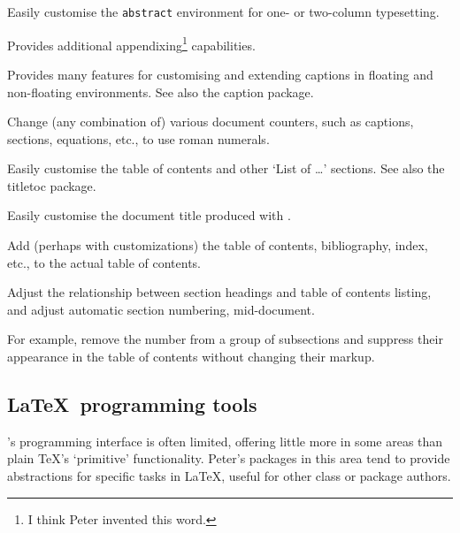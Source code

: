 \documentclass[final]{ltugboat}
\begin{document}
\begin{description}[font=\normalfont\sffamily]
\item [abstract] Easily customise the \texttt{abstract} environment for one- or two-column typesetting.
\item [appendix] Provides additional appendixing\footnote{I think Peter invented this word.} capabilities.
\item [ccaption] Provides many features for customising and extending captions in floating and non-floating environments. See also the \textsf{caption} package.
\item [romannum] Change (any combination of) various document counters, such as captions, sections, equations, etc., to use roman numerals.
\item [tocloft] Easily customise the table of contents and other `List of \dots' sections. See also the \textsf{titletoc} package.
\item [titling] Easily customise the document title produced with .
\item [tocbibind] Add (perhaps with customizations) the table of contents, bibliography, index, etc., to the actual table of contents.
\item [tocvsec2] Adjust the relationship between section headings and table of contents listing, and adjust automatic section numbering, mid-document.

For example, remove the number from a group of subsections and suppress their appearance in the table of contents without changing their markup.
\end{description}

\subsection{\LaTeX\ programming tools}

\LaTeXe's programming interface is often limited, offering little more in some areas than plain \TeX's `primitive' functionality. Peter's packages in this area tend to provide abstractions for specific tasks in \LaTeX, useful for other class or package authors.
\end{document}
